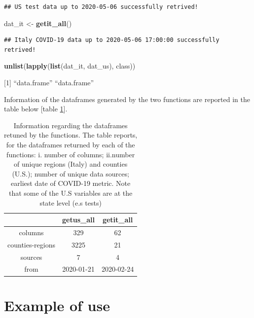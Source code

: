 \documentclass[12pt,halfline,a4paper,]{ouparticle}
\newenvironment{Shaded}{\begin{snugshade}}{\end{snugshade}}
\newcommand{\KeywordTok}[1]{\textcolor[rgb]{0.13,0.29,0.53}{\textbf{#1}}}
\newcommand{\NormalTok}[1]{#1}
\newcommand{\StringTok}[1]{\textcolor[rgb]{0.31,0.60,0.02}{#1}}
\begin{document}
\begin{verbatim}
## US test data up to 2020-05-06 successfully retrived!
\end{verbatim}

\begin{Shaded}
\begin{Highlighting}[]
\NormalTok{dat_it <-}\StringTok{ }\KeywordTok{getit_all}\NormalTok{()}
\end{Highlighting}
\end{Shaded}

\begin{verbatim}
## Italy COVID-19 data up to 2020-05-06 17:00:00 successfully retrived!
\end{verbatim}

\begin{Shaded}
\begin{Highlighting}[]
\KeywordTok{unlist}\NormalTok{(}\KeywordTok{lapply}\NormalTok{(}\KeywordTok{list}\NormalTok{(dat_it, dat_us), class))}
\end{Highlighting}
\end{Shaded}

{[}1{]} ``data.frame'' ``data.frame''

\bigskip

Information of the dataframes generated by the two functions are
reported in the table below {[}table \ref{tab:tab_dat}{]}.

\bigskip

\begin{table}[ht]
\centering
\begin{tabular}{ccc}
  \hline
 & getus\_all & getit\_all \\ 
  \hline
columns & 329 & 62 \\ 
  counties-regions & 3225 & 21 \\ 
  sources & 7 & 4 \\ 
  from & 2020-01-21 & 2020-02-24 \\ 
   \hline
\end{tabular}
\caption{Information regarding the dataframes retuned by the functions.
    The table reports, for the dataframes returned by each of the functions: i. number of columns; ii.number of unique regions (Italy) and counties (U.S.);  number of unique data sources; earliest date of COVID-19 metric. Note that some of 
    the U.S variables are at the state level (e.s tests)
    } 
\label{tab:tab_dat}
\end{table}

\hypertarget{example-of-use}{%
\section{Example of use}\label{example-of-use}}
\end{document}
